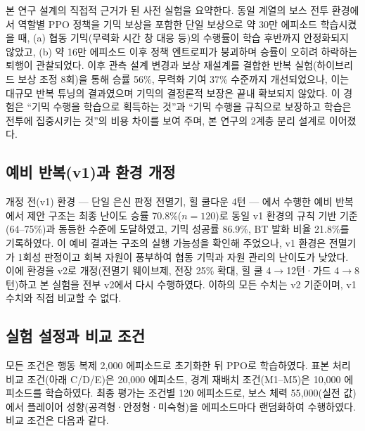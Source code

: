 \documentclass[12pt]{article}      %
\begin{document}
본 연구 설계의 직접적 근거가 된 사전 실험을 요약한다. 동일 계열의 보스 전투
환경에서 역할별 PPO 정책을 기믹 보상을 포함한 단일 보상으로 약 30만 에피소드
학습시켰을 때, (a) 협동 기믹(무력화 시간 창 대응 등)의 수행률이 학습 후반까지
안정화되지 않았고, (b) 약 16만 에피소드 이후 정책 엔트로피가 붕괴하며 승률이
오히려 하락하는 퇴행이 관찰되었다. 이후 관측 설계 변경과 보상 재설계를 결합한
반복 실험(하이브리드 보상 조정 8회)을 통해 승률 56\%, 무력화 기여 37\% 수준까지
개선되었으나, 이는 대규모 반복 튜닝의 결과였으며 기믹의 결정론적 보장은 끝내
확보되지 않았다. 이 경험은 ``기믹 수행을 학습으로 획득하는 것''과 ``기믹 수행을
규칙으로 보장하고 학습은 전투에 집중시키는 것''의 비용 차이를 보여 주며, 본
연구의 2계층 분리 설계로 이어졌다.

\subsection{예비 반복(v1)과 환경 개정}
\label{sec:v1}

개정 전(v1) 환경 --- 단일 은신 판정 전멸기, 힐 쿨다운 4턴 --- 에서 수행한 예비
반복에서 제안 구조는 최종 난이도 승률 70.8\%($n=120$)로 동일 v1 환경의 규칙 기반
기준(64--75\%)과 동등한 수준에 도달하였고, 기믹 성공률 86.9\%, BT 발화 비율
21.8\%를 기록하였다. 이 예비 결과는 구조의 실행 가능성을 확인해 주었으나, v1
환경은 전멸기가 1회성 판정이고 회복 자원이 풍부하여 협동 기믹과 자원 관리의
난이도가 낮았다. 이에 환경을 v2로 개정(전멸기 웨이브제, 전장 25\% 확대, 힐 쿨
4$\rightarrow$12턴·가드 4$\rightarrow$8턴)하고 본 실험을 전부 v2에서 다시
수행하였다. 이하의 모든 수치는 v2 기준이며, v1 수치와 직접 비교할 수 없다.

\subsection{실험 설정과 비교 조건}

모든 조건은 행동 복제 2{,}000 에피소드로 초기화한 뒤 PPO로 학습하였다. 표본
처리 비교 조건(아래 C/D/E)은 20{,}000 에피소드, 경계 재배치 조건(M1--M5)은
10{,}000 에피소드를 학습하였다. 최종 평가는 조건별 120 에피소드로, 보스 체력
55{,}000(실전 값)에서 플레이어 성향(공격형·안정형·미숙형)을 에피소드마다
랜덤화하여 수행하였다. 비교 조건은 다음과 같다.
\end{document}
